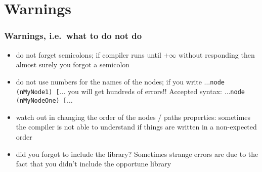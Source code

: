 \section{Warnings}


\begin{frame}
	\frametitle{Warnings, i.e.\ what to \alert{do not} do}
	\begin{itemize}
		\item<2-> \alert{do not forget semicolons}; if compiler runs until $+\infty$ without responding then almost surely you forgot a semicolon
		\item<3-> \alert{do not use numbers for the names of the nodes}; if you write \texttt{$\ldots$node (nMyNode1) [$\ldots$} you will get hundreds of errors!! Accepted syntax: \texttt{$\ldots$node (nMyNodeOne) [$\ldots$}
		\item<4-> \alert{watch out in changing the order of the nodes / paths properties}: sometimes the compiler is not able to understand if things are written in a non-expected order
		\item<5-> \alert{did you forgot to include the library?} Sometimes strange errors are due to the fact that you didn't include the opportune \Tikz library
	\end{itemize}
\end{frame}

